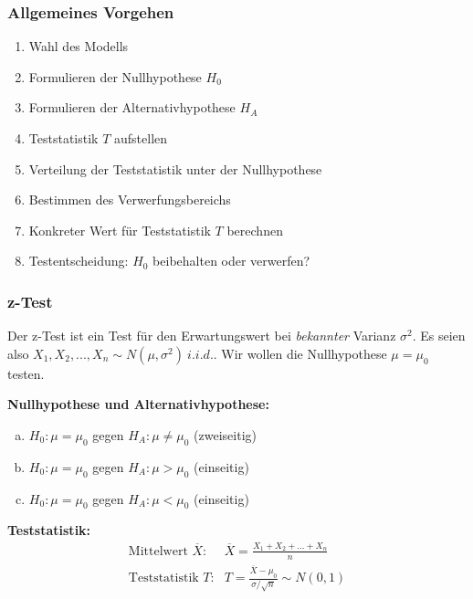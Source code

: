 \subsubsection{Allgemeines Vorgehen}
\begin{enumerate}
	\item Wahl des Modells
	\item Formulieren der Nullhypothese $H_0$
	\item Formulieren der Alternativhypothese $H_A$
	\item Teststatistik $T$ aufstellen
	\item Verteilung der Teststatistik unter der Nullhypothese
	\item Bestimmen des Verwerfungsbereichs
	\item Konkreter Wert für Teststatistik $T$ berechnen
	\item Testentscheidung: $H_0$ beibehalten oder verwerfen?
\end{enumerate}

\subsubsection{z-Test}
Der z-Test ist ein Test für den Erwartungswert bei \emph{bekannter} Varianz $\sigma^2$. Es seien also $X_1,X_2,...,X_n \sim N(\mu,\sigma^2)\ i.i.d.$. Wir wollen die Nullhypothese $\mu=\mu_0$ testen.

\vspace{10pt}

\textbf{Nullhypothese und Alternativhypothese:}
\begin{enumerate}[a)]
	\item $H_0: \mu=\mu_0$ gegen $H_A:\mu\neq \mu_0$ (zweiseitig)
	\item $H_0: \mu=\mu_0$ gegen $H_A:\mu > \mu_0$ (einseitig)
	\item $H_0: \mu=\mu_0$ gegen $H_A:\mu < \mu_0$ (einseitig)
\end{enumerate}

\vspace{10pt}

\textbf{Teststatistik:}
\[
\begin{array}{ll}
\text{Mittelwert $\overline{X}$:} & \overline{X}=\frac{X_1+X_2+...+X_n}{n} \\
\text{Teststatistik $T$:} & T = \frac{\overline{X}-\mu_0}{\sigma/\sqrt{n}}\sim N(0,1) \\
\end{array}
\]

\vspace{10pt}

